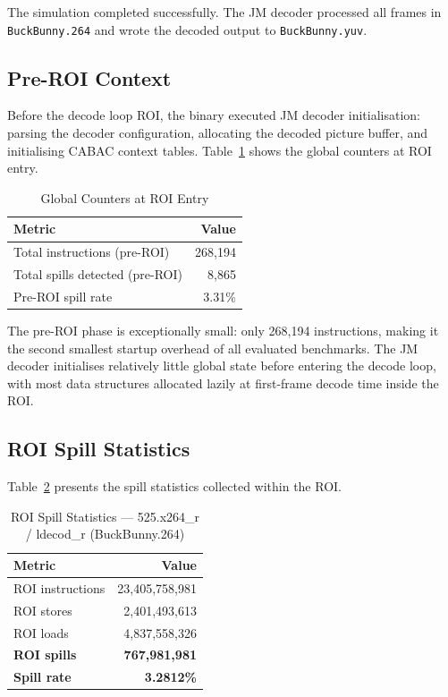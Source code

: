 \documentclass[conference]{IEEEtran}
\begin{document}
The simulation completed successfully. The JM decoder processed
all frames in \texttt{BuckBunny.264} and wrote the decoded output
to \texttt{BuckBunny.yuv}.

\subsection{Pre-ROI Context}

Before the decode loop ROI, the binary executed JM decoder
initialisation: parsing the decoder configuration, allocating
the decoded picture buffer, and initialising CABAC context tables.
Table~\ref{tab:preroi} shows the global counters at ROI entry.

\begin{table}[H]
\centering
\caption{Global Counters at ROI Entry}
\label{tab:preroi}
\begin{tabular}{lr}
\toprule
\textbf{Metric} & \textbf{Value} \\
\midrule
Total instructions (pre-ROI) & 268,194 \\
Total spills detected (pre-ROI) & 8,865 \\
Pre-ROI spill rate & 3.31\% \\
\bottomrule
\end{tabular}
\end{table}

The pre-ROI phase is exceptionally small: only 268,194 instructions,
making it the second smallest startup overhead of all evaluated
benchmarks. The JM decoder initialises relatively little global
state before entering the decode loop, with most data structures
allocated lazily at first-frame decode time inside the ROI.

\subsection{ROI Spill Statistics}

Table~\ref{tab:roi} presents the spill statistics collected within
the ROI.

\begin{table}[H]
\centering
\caption{ROI Spill Statistics --- 525.x264\_r / ldecod\_r (BuckBunny.264)}
\label{tab:roi}
\begin{tabular}{lr}
\toprule
\textbf{Metric} & \textbf{Value} \\
\midrule
ROI instructions         & 23,405,758,981 \\
ROI stores               &  2,401,493,613 \\
ROI loads                &  4,837,558,326 \\
\midrule
\textbf{ROI spills}      & \textbf{767,981,981} \\
\textbf{Spill rate}      & \textbf{3.2812\%} \\
\bottomrule
\end{tabular}
\end{table}
\end{document}
